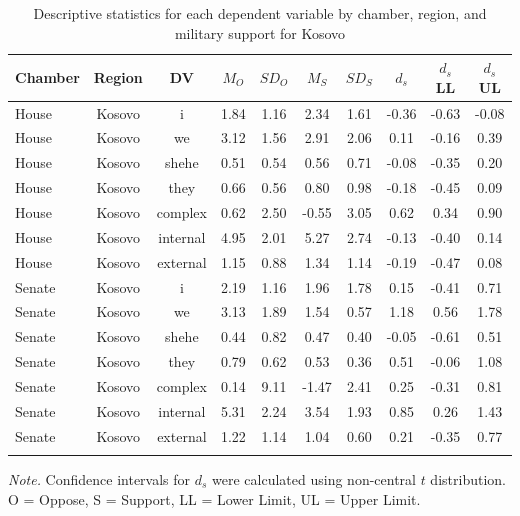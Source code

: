 \documentclass[english,,man,floatsintext]{apa6}
\begin{document}
\begin{table}[tbp]
\begin{center}
\begin{threeparttable}
\caption{\label{tab:Ktable}Descriptive statistics for each dependent variable by chamber, 
          region, and military support for Kosovo}
\small{
\begin{tabular}{lccccccccc}
\toprule
Chamber & Region & DV & $M_O$ & $SD_O$ & $M_S$ & $SD_S$ & $d_s$ & $d_s$ LL & $d_s$ UL\\
\midrule
House & Kosovo & i & 1.84 & 1.16 & 2.34 & 1.61 & -0.36 & -0.63 & -0.08\\
House & Kosovo & we & 3.12 & 1.56 & 2.91 & 2.06 & 0.11 & -0.16 & 0.39\\
House & Kosovo & shehe & 0.51 & 0.54 & 0.56 & 0.71 & -0.08 & -0.35 & 0.20\\
House & Kosovo & they & 0.66 & 0.56 & 0.80 & 0.98 & -0.18 & -0.45 & 0.09\\
House & Kosovo & complex & 0.62 & 2.50 & -0.55 & 3.05 & 0.62 & 0.34 & 0.90\\
House & Kosovo & internal & 4.95 & 2.01 & 5.27 & 2.74 & -0.13 & -0.40 & 0.14\\
House & Kosovo & external & 1.15 & 0.88 & 1.34 & 1.14 & -0.19 & -0.47 & 0.08\\
Senate & Kosovo & i & 2.19 & 1.16 & 1.96 & 1.78 & 0.15 & -0.41 & 0.71\\
Senate & Kosovo & we & 3.13 & 1.89 & 1.54 & 0.57 & 1.18 & 0.56 & 1.78\\
Senate & Kosovo & shehe & 0.44 & 0.82 & 0.47 & 0.40 & -0.05 & -0.61 & 0.51\\
Senate & Kosovo & they & 0.79 & 0.62 & 0.53 & 0.36 & 0.51 & -0.06 & 1.08\\
Senate & Kosovo & complex & 0.14 & 9.11 & -1.47 & 2.41 & 0.25 & -0.31 & 0.81\\
Senate & Kosovo & internal & 5.31 & 2.24 & 3.54 & 1.93 & 0.85 & 0.26 & 1.43\\
Senate & Kosovo & external & 1.22 & 1.14 & 1.04 & 0.60 & 0.21 & -0.35 & 0.77\\
\bottomrule
\addlinespace
\end{tabular}
}
\begin{tablenotes}[para]
\normalsize{\textit{Note.} Confidence intervals for $d_s$ were calculated using 
          non-central $t$ distribution. O = Oppose, S = Support, LL = Lower Limit, UL = Upper Limit.}
\end{tablenotes}
\end{threeparttable}
\end{center}
\end{table}
\end{document}
